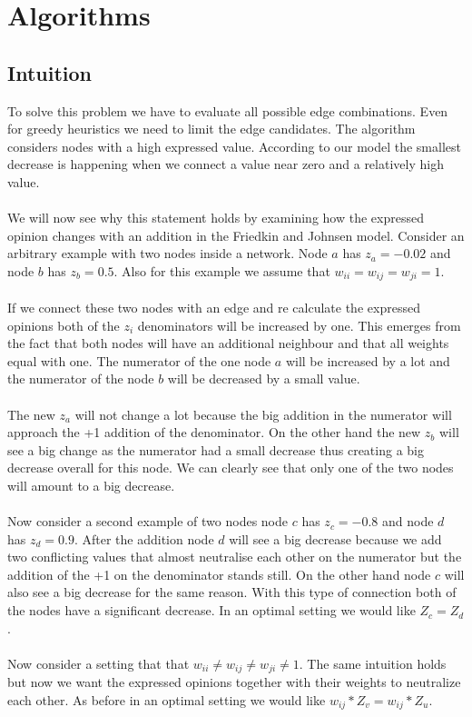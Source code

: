 \chapter{Algorithms}
\label{ch:algorithms}


\section{Intuition}
\label{sec:intuition}

To solve this problem we have to evaluate all possible edge combinations. Even for greedy heuristics we need to limit the edge candidates. The algorithm considers nodes with a high expressed value. According to our model the smallest decrease is happening when we connect a value near zero and a relatively high value.
\\
\\
We will now see why this statement holds by examining how the expressed opinion changes with an addition in the Friedkin and Johnsen model. Consider an arbitrary example with two nodes inside a network. Node $a$ has $z_a = -0.02$ and node $b$ has $z_b = 0.5$. Also for this example we assume that $w_{ii}=w_{ij}=w_{ji}=1$. 
\\
\\
If we connect these two nodes with an edge and re calculate the expressed opinions both of the $z_i$ denominators will be increased by one. This emerges from the fact that both nodes will have an additional neighbour and that all weights equal with one. The numerator of the one node $a$ will be increased by a lot and the numerator of the node $b$ will be decreased by a small value.
\\
\\
The new $z_a$ will not change a lot because the big addition in the numerator will approach the +1 addition of the denominator. On the other hand the new $z_b$ will see a big change as the numerator had a small decrease thus creating a big decrease overall for this node. We can clearly see that only one of the two nodes will amount to a big decrease. 
\\
\\
Now consider a second example of two nodes node $c$ has $z_c = -0.8$ and node $d$ has $z_d = 0.9$. After the addition node $d$ will see a big decrease because we add two conflicting values that almost neutralise each other on the numerator but the addition of the +1 on the denominator stands still. On the other hand node $c$ will also see a big decrease for the same reason. With this type of connection both of the nodes have a significant decrease. In an optimal setting we would like $Z_c = Z_d$.
\\
\\
Now consider a setting that that $w_{ii} \neq w_{ij} \neq w_{ji}\neq 1$. The same intuition holds but now we want the expressed opinions together with their weights to neutralize each other. As before in an optimal setting we would like $w_{ij} * Z_v = w_{ij} * Z_u$. 

